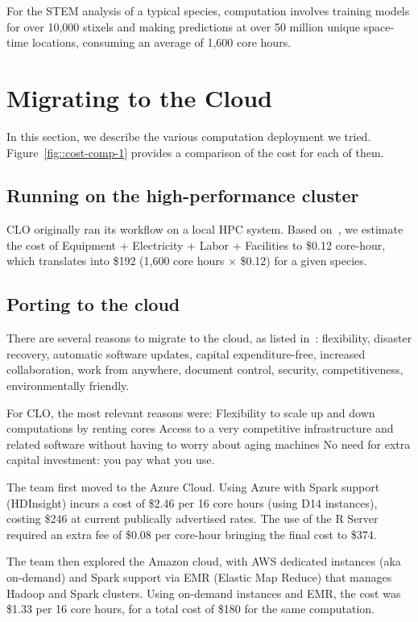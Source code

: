 \documentclass{acm_proc_article-sp}
\begin{document}
For the STEM analysis of a typical species,  computation involves training models for over 10,000 stixels and making predictions at over 50 million unique space-time locations, consuming an average of 1,600 core hours.

\section{Migrating to the Cloud}
In this section, we describe the various computation deployment we tried. Figure~\ref{fig::cost-comp-1} provides a comparison of the cost for each of them.

\subsection{Running on the high-performance cluster}
CLO originally ran its workflow on a local HPC system. Based on~\cite{Spagnuolo_undated-ih}, we estimate the cost of Equipment + Electricity + Labor + Facilities to \$0.12 core-hour, which translates into \$192 (1,600 core hours $\times$ \$0.12) for a given species.

\subsection{Porting to the cloud}
There are several reasons to migrate to the cloud, as listed in~\cite{noauthor_undated-ne}: flexibility, disaster recovery, automatic software updates, capital expenditure-free, increased collaboration, work from anywhere, document control, security, competitiveness, environmentally friendly.

For CLO, the most relevant reasons were:
Flexibility to scale up and down computations by renting cores 
Access to a very competitive infrastructure and related software without having to worry about aging machines
No need for extra capital investment: you pay what you use.

The team first moved to the Azure Cloud. Using Azure with Spark support (HDInsight) incurs a cost of \$2.46 per 16 core hours (using D14 instances), costing \$246 at current publically advertised rates. The use of the R Server required an extra fee of \$0.08 per core-hour bringing the final cost to \$374.

The team then explored the Amazon cloud, with AWS dedicated instances (aka on-demand) and Spark support via EMR (Elastic Map Reduce) that manages Hadoop and Spark clusters. Using on-demand instances and EMR, the cost was  \$1.33 per 16 core hours, for a total cost of  \$180 for the same computation.
\end{document}
